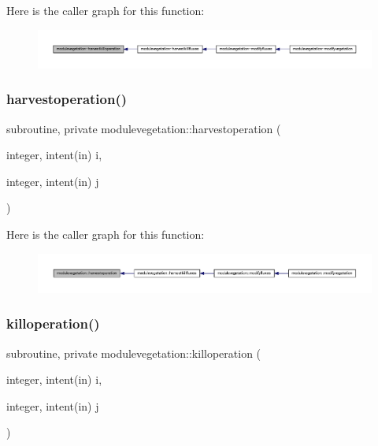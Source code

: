 Here is the caller graph for this function\+:\nopagebreak
\begin{figure}[H]
\begin{center}
\leavevmode
\includegraphics[width=350pt]{namespacemodulevegetation_a5b6084c4fb89b8ce3f29e23d6b623bef_icgraph}
\end{center}
\end{figure}
\mbox{\label{namespacemodulevegetation_a3dc6ee6dd39f0f9ae9bbbe6356b45efc}} 
\subsubsection{\texorpdfstring{harvestoperation()}{harvestoperation()}}
{\footnotesize\ttfamily subroutine, private modulevegetation\+::harvestoperation (\begin{DoxyParamCaption}\item[{integer, intent(in)}]{i,  }\item[{integer, intent(in)}]{j }\end{DoxyParamCaption})\hspace{0.3cm}{\ttfamily [private]}}

Here is the caller graph for this function\+:\nopagebreak
\begin{figure}[H]
\begin{center}
\leavevmode
\includegraphics[width=350pt]{namespacemodulevegetation_a3dc6ee6dd39f0f9ae9bbbe6356b45efc_icgraph}
\end{center}
\end{figure}
\mbox{\label{namespacemodulevegetation_a48e334671d44b0f7bf51ba2801d47db0}} 
\subsubsection{\texorpdfstring{killoperation()}{killoperation()}}
{\footnotesize\ttfamily subroutine, private modulevegetation\+::killoperation (\begin{DoxyParamCaption}\item[{integer, intent(in)}]{i,  }\item[{integer, intent(in)}]{j }\end{DoxyParamCaption})\hspace{0.3cm}{\ttfamily [private]}}

